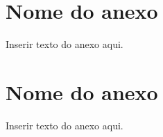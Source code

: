 %
%

\begin{anexosenv}
\partanexos

\chapter{Nome do anexo}
\label{chap:anexox}

Inserir texto do anexo aqui.

\chapter{Nome do anexo}
\label{chap:anexoy}

Inserir texto do anexo aqui.

\end{anexosenv}
